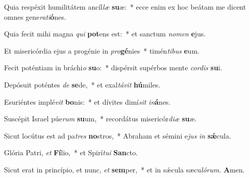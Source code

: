 \item Quia respéxit humilitátem ancíl\tinyhspace\textit{læ} \textbf{su}æ:~* ecce enim ex hoc beátam me dicent omnes gene\textit{rati}\textbf{ó}nes.
\item Quia fecit mihi magna \textit{qui} \textbf{pot}ens est:~* et sanctum \textit{nomen} \textbf{e}jus.
\item Et misericórdia ejus a progénie in \textit{pro}\tinyhspace\textbf{gé}nies~* timén\textit{tibus} \textbf{e}um.
\item Fecit poténtiam in bráchi\textit{o} \textbf{su}o:~* dispérsit supérbos mente \textit{cordis} \textbf{su}i.
\item Depósuit poténtes \textit{de} \textbf{se}de,~* et exal\textit{távit} \textbf{hú}miles.
\item Esuriéntes implé\textit{vit} \textbf{bo}nis:~* et dívites dimí\textit{sit} \textit{in}\textbf{á}nes.
\item Suscépit Israel púe\textit{rum} \textbf{su}um,~* recordátus misericór\textit{diæ} \textbf{su}æ.
\item Sicut locútus est ad pa\tinyhspace\textit{tres} \textbf{no}stros,~* Abraham et sémini e\textit{jus} \textit{in} \textbf{sǽ}cula.
\item Glória Patri, \textit{et} \textbf{Fí}lio,~* et Spirí\tinyhspace\textit{tui} \textbf{San}cto.
\item Sicut erat in princípio, et nunc, \textit{et} \textbf{sem}per,~* et in sǽcula sæcu\tinyhspace\textit{lórum.} \textbf{A}men.

